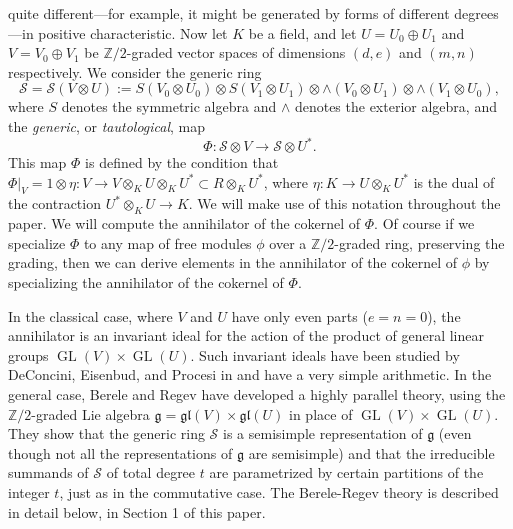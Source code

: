 \documentclass{tran-l}
\theoremstyle{plain}
\theoremstyle{remark}
\theoremstyle{definition}
\newcommand{\g}{{\mathfrak g}}
\newcommand{\gl}{{\mathfrak {gl}}}
\newcommand{\myS}{{\mathcal S}}
\newcommand{\ZZ}{\mathbb {Z}}
\begin{document}
quite different---for example, it might be generated by
forms of different degrees---in positive characteristic.
\goodbreak Now let $K$ be a field, and let 
$U=U_{0}\oplus U_{1}$ and $V=V_{0}\oplus V_{1}$ be $\ZZ /2$-graded vector
spaces of dimensions
$(d,e)$ and $(m,n)$ respectively.
We consider the generic ring
\begin{equation*}\myS =
\myS (V\otimes U) := S(V_{0}\otimes U_{0} )\otimes S(V_{1}\otimes U_{1}
)\otimes \wedge (V_{0}\otimes U_{1}
)\otimes \wedge (V_{1}\otimes U_{0} ),
\end{equation*}
where $S$ denotes the symmetric algebra and $\wedge $ denotes
the exterior algebra, and the {\em generic\/}, or
{\em tautological\/}, map
\begin{equation*}\Phi : \myS \otimes V\to \myS \otimes U^{*}.
\end{equation*}
This map $\Phi $ is defined
by the condition that
$\Phi |_{V}=1\otimes \eta : V\to V\otimes _{K} U\otimes _{K} U^{*}\subset R\otimes _{K} U^{*}$,
where $\eta : K\to U\otimes _{K} U^{*}$ is the dual of the contraction
$U^{*}\otimes _{K} U\to K$.
We will make use of this notation throughout the paper. 
We will
compute the annihilator of the cokernel of $\Phi $. Of course if
we specialize $\Phi $ to any map of free modules $\phi $ over a
$\ZZ /2$-graded ring,
preserving the grading, then we can derive elements in the
annihilator of the cokernel of $\phi $ by specializing the
annihilator of the cokernel of $\Phi $.

In the classical case, where $V$ and $U$ have only even parts
($e=n=0$), the annihilator is an invariant ideal for the action of the
product of general linear groups $\operatorname{GL}(V)\times \operatorname{GL}(U)$.
Such invariant ideals have been studied by DeConcini, Eisenbud, and
Procesi in \cite{DEP} and have a very simple arithmetic.  In the general
case, Berele and Regev \cite{BR} have developed a highly parallel theory,
using the $\ZZ /2$-graded Lie algebra $\g ={\gl }(V)\times {\gl }(U)$ in
place of $\operatorname{GL}(V)\times \operatorname{GL}(U)$.  They show that the generic
ring $\myS $ is a semisimple representation of $\g $ (even though not all
the representations of $\g $ are semisimple)  and that the irreducible
summands of $\myS $ of total degree $t$ are parametrized by certain
partitions of the integer $t$, just as in the commutative case.
The Berele-Regev theory is described in detail below, in Section 1 of this
paper.  
\end{document}
